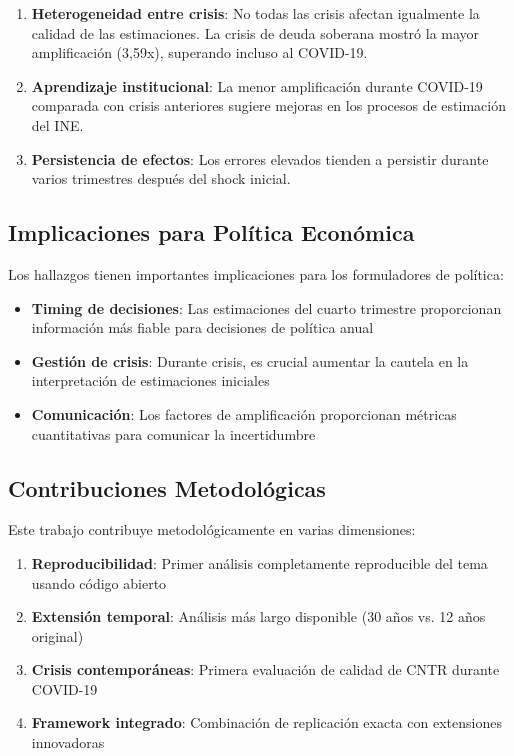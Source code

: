 \documentclass{article}
\begin{document}
\begin{enumerate}
\item \textbf{Heterogeneidad entre crisis}: No todas las crisis afectan igualmente la calidad de las estimaciones. La crisis de deuda soberana mostró la mayor amplificación (3,59x), superando incluso al COVID-19.

\item \textbf{Aprendizaje institucional}: La menor amplificación durante COVID-19 comparada con crisis anteriores sugiere mejoras en los procesos de estimación del INE.

\item \textbf{Persistencia de efectos}: Los errores elevados tienden a persistir durante varios trimestres después del shock inicial.
\end{enumerate}

\subsection{Implicaciones para Política Económica}

Los hallazgos tienen importantes implicaciones para los formuladores de política:

\begin{itemize}
\item \textbf{Timing de decisiones}: Las estimaciones del cuarto trimestre proporcionan información más fiable para decisiones de política anual
\item \textbf{Gestión de crisis}: Durante crisis, es crucial aumentar la cautela en la interpretación de estimaciones iniciales
\item \textbf{Comunicación}: Los factores de amplificación proporcionan métricas cuantitativas para comunicar la incertidumbre
\end{itemize}

\subsection{Contribuciones Metodológicas}

Este trabajo contribuye metodológicamente en varias dimensiones:

\begin{enumerate}
\item \textbf{Reproducibilidad}: Primer análisis completamente reproducible del tema usando código abierto
\item \textbf{Extensión temporal}: Análisis más largo disponible (30 años vs. 12 años original)
\item \textbf{Crisis contemporáneas}: Primera evaluación de calidad de CNTR durante COVID-19
\item \textbf{Framework integrado}: Combinación de replicación exacta con extensiones innovadoras
\end{enumerate}
\end{document}
